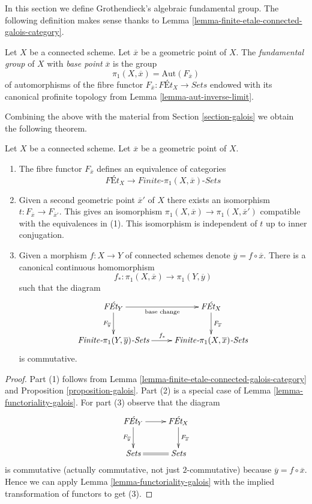 \noindent
In this section we define Grothendieck's algebraic fundamental group.
The following definition makes sense thanks to
Lemma \ref{lemma-finite-etale-connected-galois-category}.

\begin{definition}
\label{definition-fundamental-group}
Let $X$ be a connected scheme. Let $\overline{x}$ be a geometric point
of $X$. The {\it fundamental group} of $X$ with
{\it base point} $\overline{x}$ is the group
$$
\pi_1(X, \overline{x}) = \text{Aut}(F_{\overline{x}})
$$
of automorphisms of the fibre functor
$F_{\overline{x}} : \textit{F\'Et}_X \to \textit{Sets}$
endowed with its canonical profinite topology from
Lemma \ref{lemma-aut-inverse-limit}.
\end{definition}

\noindent
Combining the above with the material from Section \ref{section-galois}
we obtain the following theorem.

\begin{theorem}
\label{theorem-fundamental-group}
Let $X$ be a connected scheme. Let $\overline{x}$ be a geometric point
of $X$.
\begin{enumerate}
\item The fibre functor $F_{\overline{x}}$ defines an equivalence of
categories
$$
\textit{F\'Et}_X \longrightarrow
\textit{Finite-}\pi_1(X, \overline{x})\textit{-Sets}
$$
\item Given a second geometric point $\overline{x}'$ of $X$ there
exists an isomorphism $t : F_{\overline{x}} \to F_{\overline{x}'}$.
This gives an isomorphism $\pi_1(X, \overline{x}) \to \pi_1(X, \overline{x}')$
compatible with the equivalences in (1). This isomorphism is
independent of $t$ up to inner conjugation.
\item Given a morphism $f : X \to Y$ of connected schemes denote
$\overline{y} = f \circ \overline{x}$. There is a canonical
continuous homomorphism
$$
f_* : \pi_1(X, \overline{x}) \to \pi_1(Y, \overline{y})
$$
such that the diagram
$$
\xymatrix{
\textit{F\'Et}_Y \ar[r]_{\text{base change}} \ar[d]_{F_{\overline{y}}} &
\textit{F\'Et}_X \ar[d]^{F_{\overline{x}}} \\
\textit{Finite-}\pi_1(Y, \overline{y})\textit{-Sets} \ar[r]^{f_*} &
\textit{Finite-}\pi_1(X, \overline{x})\textit{-Sets}
}
$$
is commutative.
\end{enumerate}
\end{theorem}

\begin{proof}
Part (1) follows from Lemma \ref{lemma-finite-etale-connected-galois-category}
and Proposition \ref{proposition-galois}.
Part (2) is a special case of Lemma \ref{lemma-functoriality-galois}.
For part (3) observe that the diagram
$$
\xymatrix{
\textit{F\'Et}_Y \ar[r] \ar[d]_{F_{\overline{y}}} &
\textit{F\'Et}_X \ar[d]^{F_{\overline{x}}} \\
\textit{Sets} \ar@{=}[r] & \textit{Sets}
}
$$
is commutative (actually commutative, not just $2$-commutative) because
$\overline{y} = f \circ \overline{x}$. Hence
we can apply Lemma \ref{lemma-functoriality-galois} with the implied
transformation of functors to get (3).
\end{proof}


